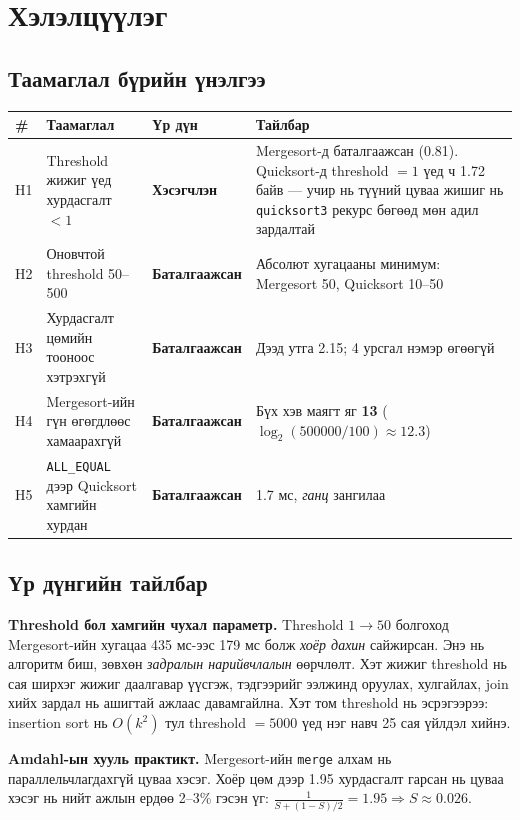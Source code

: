\documentclass[11pt,a4paper]{article}
\begin{document}
\section{Хэлэлцүүлэг}

\subsection{Таамаглал бүрийн үнэлгээ}
\begin{center}
\small
\begin{tabular}{L{0.7cm}L{3.9cm}L{2.7cm}L{6.2cm}}
\toprule
\# & Таамаглал & Үр дүн & Тайлбар \\
\midrule
H1 & Threshold жижиг үед хурдасгалт $<1$ & \textbf{Хэсэгчлэн} &
Mergesort-д баталгаажсан (0.81). Quicksort-д threshold $=1$ үед ч 1.72 байв ---
учир нь түүний цуваа жишиг нь \texttt{quicksort3} рекурс бөгөөд мөн адил
зардалтай \\
H2 & Оновчтой threshold 50--500 & \textbf{Баталгаажсан} &
Абсолют хугацааны минимум: Mergesort 50, Quicksort 10--50 \\
H3 & Хурдасгалт цөмийн тооноос хэтрэхгүй & \textbf{Баталгаажсан} &
Дээд утга 2.15; 4 урсгал нэмэр өгөөгүй \\
H4 & Mergesort-ийн гүн өгөгдлөөс хамаарахгүй & \textbf{Баталгаажсан} &
Бүх хэв маягт яг \textbf{13} ($\log_2(500000/100) \approx 12.3$) \\
H5 & \texttt{ALL\_EQUAL} дээр Quicksort хамгийн хурдан & \textbf{Баталгаажсан} &
1.7 мс, \emph{ганц} зангилаа \\
\bottomrule
\end{tabular}
\end{center}

\subsection{Үр дүнгийн тайлбар}

\textbf{Threshold бол хамгийн чухал параметр.} Threshold $1 \to 50$ болгоход
Mergesort-ийн хугацаа 435 мс-ээс 179 мс болж \emph{хоёр дахин} сайжирсан.
Энэ нь алгоритм биш, зөвхөн \emph{задралын нарийвчлалын} өөрчлөлт. Хэт жижиг
threshold нь сая ширхэг жижиг даалгавар үүсгэж, тэдгээрийг ээлжинд оруулах,
хулгайлах, join хийх зардал нь ашигтай ажлаас давамгайлна. Хэт том threshold
нь эсрэгээрээ: insertion sort нь $O(k^2)$ тул threshold $=5000$ үед нэг навч
25 сая үйлдэл хийнэ.

\textbf{Amdahl-ын хууль практикт.} Mergesort-ийн \texttt{merge} алхам нь
параллельчлагдахгүй цуваа хэсэг. Хоёр цөм дээр 1.95 хурдасгалт гарсан нь
цуваа хэсэг нь нийт ажлын ердөө 2--3\% гэсэн үг:
$\frac{1}{S + (1-S)/2} = 1.95 \Rightarrow S \approx 0.026$.
\end{document}
